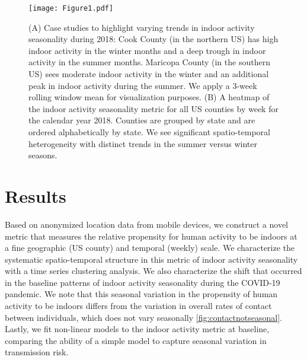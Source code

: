 \documentclass{article}
\begin{document}
\begin{figure}
    \centering
    \texttt{[image: Figure1.pdf]}
    \caption{(A) Case studies to highlight varying trends in indoor activity seasonality during 2018: Cook County (in the northern US) has high indoor activity in the winter months and a deep trough in indoor activity in the summer months. Maricopa County (in the southern US) sees moderate indoor activity in the winter and an additional peak in indoor activity during the summer. We apply a 3-week rolling window mean for visualization purposes. (B) A heatmap of the indoor activity seasonality metric for all US counties by week for the calendar year 2018. Counties are grouped by state and are ordered alphabetically by state. We see significant spatio-temporal heterogeneity with distinct trends in the summer versus winter seasons. }
    \label{fig:metric}
\end{figure}

\section*{Results}

Based on anonymized location data from mobile devices, we construct a novel metric that measures the relative propensity for human activity to be indoors at a fine geographic (US county) and temporal (weekly) scale. We characterize the systematic spatio-temporal structure in this metric of indoor activity seasonality with a time series clustering analysis. We also characterize the shift that occurred in the baseline patterns of indoor activity seasonality during the COVID-19 pandemic. We note that this seasonal variation in the propensity of human activity to be indoors differs from the variation in overall rates of contact between individuals, which does not vary seasonally \ref{fig:contactnotseasonal}.
Lastly, we fit non-linear models to the indoor activity metric at baseline, comparing the ability of a simple model to capture seasonal variation in transmission risk. 
\end{document}
